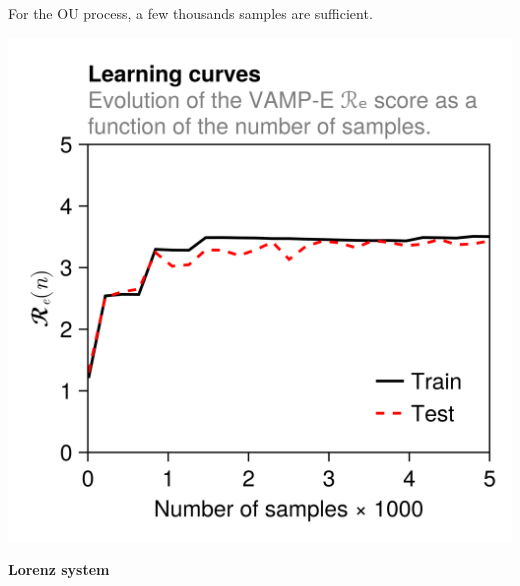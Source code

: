\documentclass[aspectratio=169, usenames, dvipsnames]{beamer}
\begin{document}
{\begin{frame}
\begin{minipage}{.48\textwidth}
      For the OU process, a few thousands samples are sufficient.
    \end{minipage}%
    \hfill
    \begin{minipage}{.48\textwidth}
      \centering
      \includegraphics[width=\textwidth]{OU_process_learning_curve}
    \end{minipage}
    \vfill
  \end{frame}

  \begin{frame}
    \vfill
    \begin{minipage}{.48\textwidth}
      \centering
      \textbf{Lorenz system}


\end{minipage}
\end{frame}}
\end{document}
